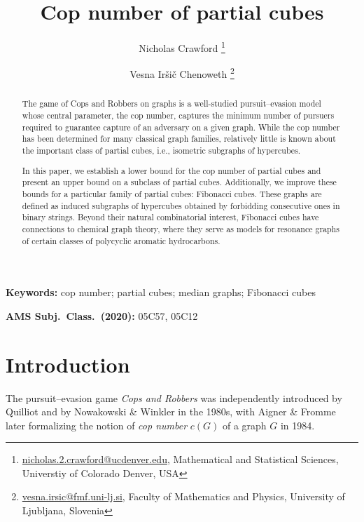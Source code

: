 \documentclass[11pt]{article}
\begin{document}
\title{Cop number of partial cubes}

\author{Nicholas Crawford \footnote{\href{mailto:nicholas.2.crawford@ucdenver.edu}{nicholas.2.crawford@ucdenver.edu}, Mathematical and Statistical Sciences, Universtiy of Colorado Denver, USA}
\and Vesna Ir\v si\v c Chenoweth \footnote{\href{mailto:vesna.irsic@fmf.uni-lj.si}{vesna.irsic@fmf.uni-lj.si}, Faculty of Mathematics and Physics, University of Ljubljana, Slovenia}}

\maketitle

\begin{abstract}
The game of Cops and Robbers on graphs is a well-studied pursuit--evasion model whose central parameter, the cop number, captures the minimum number of pursuers required to guarantee capture of an adversary on a given graph. While the cop number has been determined for many classical graph families, relatively little is known about the important class of partial cubes, i.e., isometric subgraphs of hypercubes.  

In this paper, we establish a lower bound for the cop number of partial cubes and present an upper bound on a subclass of partial cubes. Additionally, we improve these bounds for a particular family of partial cubes: Fibonacci cubes. These graphs are defined as induced subgraphs of hypercubes obtained by forbidding consecutive ones in binary strings. Beyond their natural combinatorial interest, Fibonacci cubes have connections to chemical graph theory, where they serve as models for resonance graphs of certain classes of polycyclic aromatic hydrocarbons. 

\end{abstract}

\noindent
{\bf Keywords:} cop number; partial cubes; median graphs; Fibonacci cubes

\noindent
{\bf AMS Subj.\ Class.\ (2020):} 05C57, 05C12

\section{Introduction}
\label{sec:intro}

The pursuit--evasion game \emph{Cops and Robbers} was independently introduced by Quilliot \cite{Quilliot1983} and by Nowakowski \& Winkler \cite{NowakowskiWinkler1983} in the 1980s, with Aigner \& Fromme \cite{AignerFromme1984} later formalizing the notion of \emph{cop number} $c(G)$ of a graph $G$ in 1984.
\end{document}
